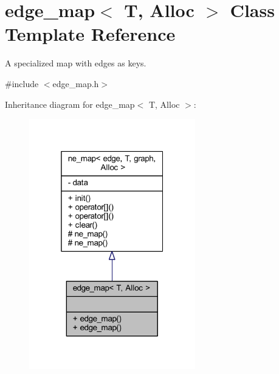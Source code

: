 \hypertarget{classedge__map}{}\section{edge\+\_\+map$<$ T, Alloc $>$ Class Template Reference}
\label{classedge__map}


A specialized map with edges as keys.  




{\ttfamily \#include $<$edge\+\_\+map.\+h$>$}



Inheritance diagram for edge\+\_\+map$<$ T, Alloc $>$\+:\nopagebreak
\begin{figure}[H]
\begin{center}
\leavevmode
\includegraphics[width=205pt]{classedge__map__inherit__graph}
\end{center}
\end{figure}


